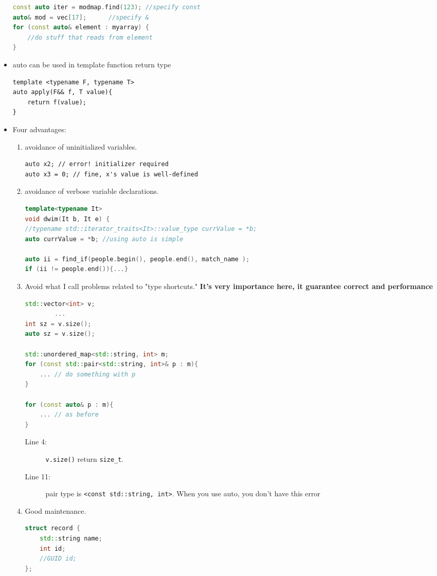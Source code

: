 \documentclass[a4paper,11pt,twoside]{book}
\begin{document}
\begin{itemize}
\begin{lstlisting}[frame=single, language=c++]
const auto iter = modmap.find(123); //specify const
auto& mod = vec[17];      //specify &
for (const auto& element : myarray) {
	//do stuff that reads from element
}
\end{lstlisting}
	
	\item auto can be used in template function return type
\begin{lstlisting}
template <typename F, typename T>
auto apply(F&& f, T value){
	return f(value);
}
\end{lstlisting}

	\item Four advantages:
	\begin{enumerate}
		\item avoidance of uninitialized variables.
\begin{lstlisting}[numbers=none]
auto x2; // error! initializer required
auto x3 = 0; // fine, x's value is well-defined
\end{lstlisting}

		\item avoidance of verbose variable declarations.
\begin{lstlisting}[frame=single, language=c++]
template<typename It>
void dwim(It b, It e) {
//typename std::iterator_traits<It>::value_type currValue = *b;
auto currValue = *b; //using auto is simple
	
auto ii = find_if(people.begin(), people.end(), match_name );               
if (ii != people.end()){...}
\end{lstlisting}

		\item Avoid what I call problems related to "type shortcuts." \textbf{It's very importance here, it guarantee correct and performance}
\begin{lstlisting}[frame=single, language=c++]
std::vector<int> v;
		...
int sz = v.size();
auto sz = v.size();
		
std::unordered_map<std::string, int> m;
for (const std::pair<std::string, int>& p : m){
	... // do something with p
}

for (const auto& p : m){
	... // as before
}
\end{lstlisting}
\begin{description}
	\item[Line 4:] \texttt{v.size()} return \texttt{size\_t}.
	\item[Line 11:] pair type is \texttt{<const std::string, int>}. When you use auto, you don't have this error
\end{description}
	\item Good maintenance.
\begin{lstlisting}[frame=single, language=c++, mathescape=true]
struct record {
	std::string name;
	int id;
	//GUID id; 
};


\end{lstlisting}
\end{enumerate}
\end{itemize}
\end{document}
